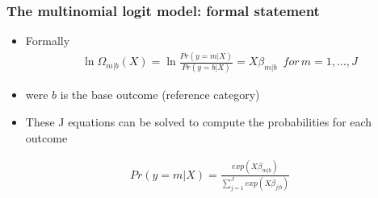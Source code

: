 \documentclass[
  shownotes,
  xcolor={svgnames},
  hyperref={colorlinks,citecolor=DarkBlue,linkcolor=DarkRed,urlcolor=DarkBlue}
  , aspectratio=169]{beamer}
\begin{document}
\begin{frame}[fragile]
\frametitle{The multinomial logit model: formal statement}

\begin{itemize}
\item Formally
\medskip 
\begin{align}
\ln \Omega_{m|b}(X)=\ln \frac{Pr(y=m|X)}{Pr(y=b|X)}=X\beta_{m|b} \,\,\, for\, m=1, \dots, J
\end{align}
\medskip 
\item were $b$ is the base outcome (reference category)
\medskip 
\item These J equations can be solved to compute the probabilities for each outcome
\end{itemize}

  \begin{align}
  Pr(y=m|X) = \frac{exp(X\beta_{m|b})}{\sum_{j=1}^J exp(X\beta_{j|b})}
  \end{align}

\end{frame}
\end{document}
